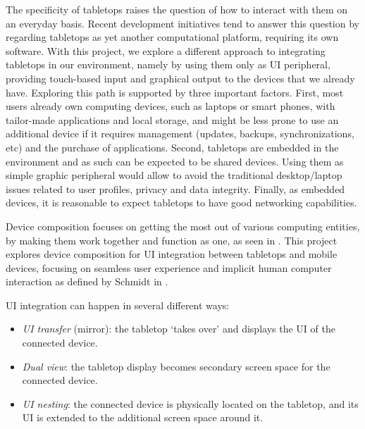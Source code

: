 The specificity of tabletops raises the question of how to interact with them on an everyday basis.
Recent development initiatives tend to answer this question by regarding tabletops as yet another computational platform, requiring its own software.
With this project, we explore a different approach to integrating tabletops in our environment, namely by using them only as UI peripheral, providing touch-based input and graphical output to the devices that we already have.
Exploring this path is supported by three important factors.
First, most users already own computing devices, such as laptops or smart phones, with tailor-made applications and local storage, and might be less prone to use an additional device if it requires management (updates, backups, synchronizations, etc) and the purchase of applications.
Second, tabletops are embedded in the environment and as such can be expected to be shared devices.
Using them as simple graphic peripheral would allow to avoid the traditional desktop/laptop issues related to user profiles, privacy and data integrity.
Finally, as embedded devices, it is reasonable to expect tabletops to have good networking capabilities.

Device composition focuses on getting the most out of various computing entities, by making them work together and function as one, as seen in \cite{Bardram:2010:compute}.
This project explores device composition for UI integration between tabletops and mobile devices, focusing on seamless user experience and implicit human computer interaction as defined by Schmidt in \cite{implicitHCI}.

UI integration can happen in several different ways:
\begin{itemize}
\item{\emph{UI transfer} (mirror): the tabletop `takes over' and displays the UI of the connected device.}
\item{\emph{Dual view}: the tabletop display becomes secondary screen space for the connected device.}
\item{\emph{UI nesting}: the connected device is physically located on the tabletop, and its UI is extended to the additional screen space around it.}
\end{itemize}

